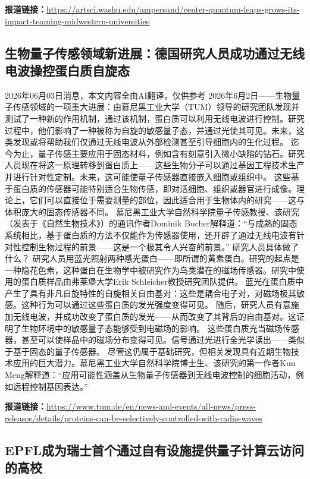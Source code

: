 \documentclass[12pt,a4paper]{ctexart}
\begin{document}
\noindent\textbf{报道链接：}\url{https://artsci.washu.edu/ampersand/center-quantum-leaps-grows-its-impact-teaming-midwestern-universities}

\subsection{ 生物量子传感领域新进展：德国研究人员成功通过无线电波操控蛋白质自旋态 }

2026年06月03日消息，本文内容全由AI翻译，仅供参考
2026年6月2日——生物量子传感领域的一项重大进展：由慕尼黑工业大学（TUM）领导的研究团队发现并测试了一种新的作用机制，通过该机制，蛋白质可以利用无线电波进行控制。研究过程中，他们影响了一种被称为自旋的敏感量子态，并通过光使其可见。未来，这类发现或将帮助我们仅通过无线电波从外部检测甚至引导细胞内的生化过程。
迄今为止，量子传感主要应用于固态材料，例如含有刻意引入微小缺陷的钻石。研究人员现在将这一原理转移到蛋白质上——这些生物分子可以通过基因工程技术生产并进行针对性定制。未来，这可能使量子传感器直接嵌入细胞或组织中。
这些基于蛋白质的传感器可能特别适合生物传感，即对活细胞、组织或器官进行成像。理论上，它们可以直接位于需要测量的部位，因此适合用于生物体内的研究——这与体积庞大的固态传感器不同。
慕尼黑工业大学自然科学院量子传感教授、该研究（发表于《自然生物技术》）的通讯作者Dominik Bucher解释道：“与成熟的固态系统相比，基于蛋白质的方法不仅能作为传感器使用，还开辟了通过无线电波有针对性控制生物过程的前景——这是一个极其令人兴奋的前景。”
研究人员具体做了什么？
研究人员用蓝光照射两种感光蛋白——即所谓的黄素蛋白。研究的起点是一种隐花色素，这种蛋白在生物学中被研究作为鸟类潜在的磁场传感器。研究中使用的蛋白质样品由弗莱堡大学Erik Schleicher教授研究团队提供。
蓝光在蛋白质中产生了具有非凡自旋特性的自旋相关自由基对：这些是耦合电子对，对磁场极其敏感。这种行为可以通过这些蛋白质的发光强度变得可见。
随后，研究人员有意施加无线电波，并成功改变了蛋白质的发光——从而改变了其背后的自由基对。这证明了生物环境中的敏感量子态能够受到电磁场的影响。
这些蛋白质充当磁场传感器，甚至可以使样品中的磁场分布变得可见。信号通过光进行全光学读出——类似于基于固态的量子传感器。
尽管这仍属于基础研究，但相关发现具有近期生物技术应用的巨大潜力。慕尼黑工业大学自然科学院博士生、该研究的第一作者Kun Meng解释道：“应用可能性涵盖从生物量子传感器到无线电波控制的细胞活动，例如远程控制基因表达。”

\noindent\textbf{报道链接：}\url{https://www.tum.de/en/news-and-events/all-news/press-releases/details/proteins-can-be-selectively-controlled-with-radio-waves}

\subsection{ EPFL成为瑞士首个通过自有设施提供量子计算云访问的高校 }
\end{document}
